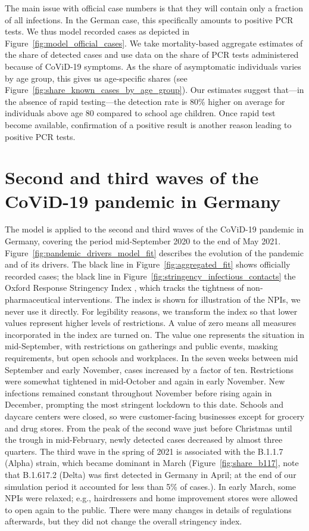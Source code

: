 The main issue with official case numbers is that they will contain only a fraction of
all infections. In the German case, this specifically amounts to positive PCR tests. We
thus model recorded cases as depicted in Figure~\ref{fig:model_official_cases}. We take
mortality-based aggregate estimates of the share of detected cases and use data on the
share of PCR tests administered because of CoViD-19
symptoms. As the share of asymptomatic individuals
varies by age group, this gives us age-specific shares (see
Figure~\ref{fig:share_known_cases_by_age_group}). Our estimates suggest that---in the
absence of rapid testing---the detection rate is 80\% higher on average for individuals
above age 80 compared to school age children. Once rapid test become available,
confirmation of a positive result is another reason leading to positive PCR tests.

\section{Second and third waves of the CoViD-19 pandemic in Germany}

The model is applied to the second and third waves of the CoViD-19 pandemic in Germany,
covering the period mid-September 2020 to the end of May 2021.
Figure~\ref{fig:pandemic_drivers_model_fit} describes the evolution of the pandemic and
of its drivers. The black line in Figure~\ref{fig:aggregated_fit} shows officially
recorded cases; the black line in Figure~\ref{fig:stringency_infectious_contacts} the
Oxford Response Stringency Index \citep{Hale2020}, which tracks the tightness of
non-pharmaceutical interventions. The index is shown for illustration of the NPIs, we
never use it directly. For legibility reasons, we transform the index so that lower
values represent higher levels of restrictions. A value of zero means all measures
incorporated in the index are turned on. The value one represents the situation in
mid-September, with restrictions on gatherings and public events, masking requirements,
but open schools and workplaces. In the seven weeks between mid September and early
November, cases increased by a factor of ten. Restrictions were somewhat tightened in
mid-October and again in early November. New infections remained constant throughout
November before rising again in December, prompting the most stringent lockdown to this
date. Schools and daycare centers were closed, so were customer-facing businesses except
for grocery and drug stores. From the peak of the second wave just before Christmas
until the trough in mid-February, newly detected cases decreased by almost three
quarters. The third wave in the spring of 2021 is associated with the B.1.1.7 (Alpha)
strain, which became dominant in March (Figure~\ref{fig:share_b117}, note that B.1.617.2
(Delta) was first detected in Germany in April; at the end of our simulation period it
accounted for less than 5\% of cases.). In early March, some NPIs were relaxed; e.g.,
hairdressers and home improvement stores were allowed to open again to the public. There
were many changes in details of regulations afterwards, but they did not change the
overall stringency index.

